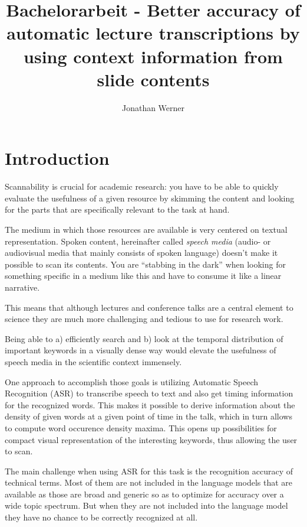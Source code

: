 \documentclass[]{article}
\title{Bachelorarbeit - Better accuracy of automatic lecture transcriptions by
using context information from slide contents}
\author{Jonathan Werner}
\date{}
\begin{document}
\maketitle

{
\hypersetup{linkcolor=black}
\setcounter{tocdepth}{3}
\tableofcontents
}
\newpage

\section*{Introduction}\label{introduction}

Scannability is crucial for academic research: you have to be able to
quickly evaluate the usefulness of a given resource by skimming the
content and looking for the parts that are specifically relevant to the
task at hand.

The medium in which those resources are available is very centered on
textual representation. Spoken content, hereinafter called \emph{speech
media} (audio- or audiovisual media that mainly consists of spoken
language) doesn't make it possible to scan its contents. You are
``stabbing in the dark'' when looking for something specific in a medium
like this and have to consume it like a linear narrative.

This means that although lectures and conference talks are a central
element to science they are much more challenging and tedious to use for
research work.

Being able to a) efficiently search and b) look at the temporal
distribution of important keywords in a visually dense way would elevate
the usefulness of speech media in the scientific context immensely.

One approach to accomplish those goals is utilizing Automatic Speech
Recognition (ASR) to transcribe speech to text and also get timing
information for the recognized words. This makes it possible to derive
information about the density of given words at a given point of time in
the talk, which in turn allows to compute word occurence density maxima.
This opens up possibilities for compact visual representation of the
interesting keywords, thus allowing the user to scan.

The main challenge when using ASR for this task is the recognition
accuracy of technical terms. Most of them are not included in the
language models that are available as those are broad and generic so as
to optimize for accuracy over a wide topic spectrum. But when they are
not included into the language model they have no chance to be correctly
recognized at all.
\end{document}
